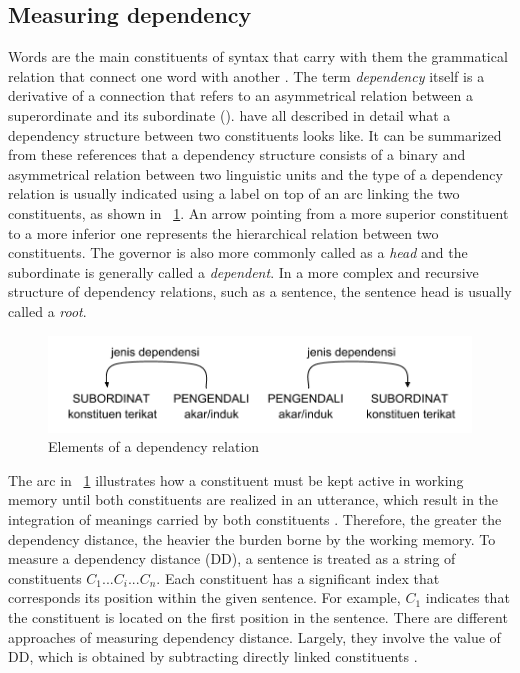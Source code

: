 \documentclass[10pt, a4paper, conference, compsocconf]{IEEEtran}
\begin{document}

\subsection{Measuring dependency}

Words are the main constituents of syntax that carry with them the grammatical relation that connect one word with another \citep{tesniere1959elements}. The term \textit{dependency} itself is a derivative of a connection that refers to an asymmetrical relation between a superordinate and its subordinate (\citealp{hudson1984word, heringer1993dependency, tesniere1959elements}). \citet{tesniere1959elements, hudson1984word, liu2009chinese} have all described in detail what a dependency structure between two constituents looks like. It can be summarized from these references that a dependency structure consists of a binary and asymmetrical relation between two linguistic units and the type of a dependency relation is usually indicated using a label on top of an arc linking the two constituents, as shown in \pic~\ref{fig:tautandependensi}. An arrow pointing from a more superior constituent to a more inferior one represents the hierarchical relation between two constituents. The governor is also more commonly called as a \textit{head} and the subordinate is generally called a \textit{dependent}. In a more complex and recursive structure of dependency relations, such as a sentence, the sentence head is usually called a \textit{root}.

\begin{figure}
	\centering \includegraphics[width=0.8
	\textwidth] {pics/tautandependensi.png} \caption{Elements of a dependency relation} 
\label{fig:tautandependensi} \end{figure}

The arc in \pic~\ref{fig:tautandependensi} illustrates how a constituent must be kept active in working memory until both constituents are realized in an utterance, which result in the integration of meanings carried by both constituents \citep{hudson2003psychological, liu2008dependency}. Therefore, the greater the dependency distance, the heavier the burden borne by the working memory. To measure a dependency distance (DD), a sentence is treated as a string of constituents $C_{1}...C_{i}...C_{n}$. Each constituent has a significant index that corresponds its position within the given sentence. For example, $C_{1}$ indicates that the constituent is located on the first position in the sentence. There are different approaches of measuring dependency distance. Largely, they involve the value of DD, which is obtained by subtracting directly linked constituents \citep{liu2008dependency, liu2017dependency, futrell2015large}.
\end{document}
